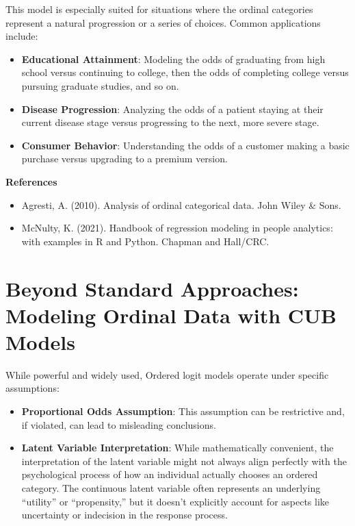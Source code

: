 \documentclass[
  letterpaper,
  DIV=11,
  numbers=noendperiod]{scrartcl}
\begin{document}
This model is especially suited for situations where the ordinal
categories represent a natural progression or a series of choices.
Common applications include:

\begin{itemize}
\item
  \textbf{Educational Attainment}: Modeling the odds of graduating from
  high school versus continuing to college, then the odds of completing
  college versus pursuing graduate studies, and so on.
\item
  \textbf{Disease Progression}: Analyzing the odds of a patient staying
  at their current disease stage versus progressing to the next, more
  severe stage.
\item
  \textbf{Consumer Behavior}: Understanding the odds of a customer
  making a basic purchase versus upgrading to a premium version.
\end{itemize}

\textbf{References}

\begin{itemize}
\item
  Agresti, A. (2010). Analysis of ordinal categorical data. John Wiley
  \& Sons.
\item
  McNulty, K. (2021). Handbook of regression modeling in people
  analytics: with examples in R and Python. Chapman and Hall/CRC.
\end{itemize}

\hypertarget{beyond-standard-approaches-modeling-ordinal-data-with-cub-models}{%
\section{Beyond Standard Approaches: Modeling Ordinal Data with CUB
Models}\label{beyond-standard-approaches-modeling-ordinal-data-with-cub-models}}

While powerful and widely used, Ordered logit models operate under
specific assumptions:

\begin{itemize}
\item
  \textbf{Proportional Odds Assumption}: This assumption can be
  restrictive and, if violated, can lead to misleading conclusions.
\item
  \textbf{Latent Variable Interpretation}: While mathematically
  convenient, the interpretation of the latent variable might not always
  align perfectly with the psychological process of how an individual
  actually chooses an ordered category. The continuous latent variable
  often represents an underlying ``utility'' or ``propensity,'' but it
  doesn't explicitly account for aspects like uncertainty or indecision
  in the response process.
\end{itemize}
\end{document}
